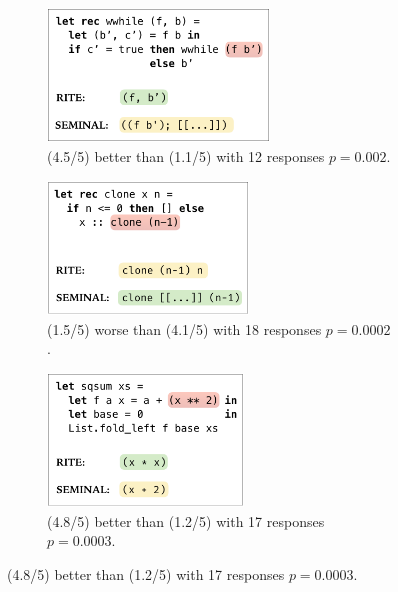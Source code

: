 \begin{figure}
\begin{subfigure}[t]{.33\textwidth}
\centering
\includegraphics[height=1.4in]{comp1.png}
\caption{\toolname (4.5/5) better than \seminal(1.1/5) with 12 responses $p=0.002$.}
\label{subfig:good1}
\end{subfigure}
\begin{subfigure}[t]{.33\textwidth}
\centering
\includegraphics[height=1.4in]{comp2.png}
\caption{\toolname (1.5/5) worse than \seminal(4.1/5) with 18 responses $p=0.0002$.}
\label{subfig:bad}
\end{subfigure}
\begin{subfigure}[t]{.29\textwidth}
\centering
\includegraphics[height=1.4in]{comp3.png}
\caption{\toolname (4.8/5) better than \seminal(1.2/5) with 17 responses $p=0.0003$.}
\label{subfig:good2}
\end{subfigure}
\end{figure}

